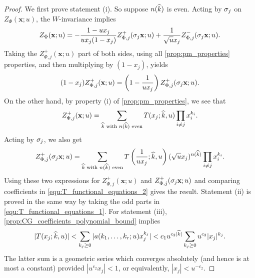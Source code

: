     \begin{proof}
        We first prove statement (i). So suppose $n(\widehat{k})$ is even. Acting by $\sigma_{j}$ on $Z_{\Phi}(\mathbf{x};u)$, the $W$-invariance implies
        \begin{equation}\label{equ:T_functional_equations_1}
            Z_{\Phi}(\mathbf{x};u) = -\frac{1-ux_{j}}{ux_{j}(1-x_{j})}Z_{\Phi,j}^{+}(\sigma_{j}\mathbf{x};u)+\frac{1}{\sqrt{u}x_{j}}Z_{\Phi,j}^{-}(\sigma_{j}\mathbf{x};u).
        \end{equation}
        Taking the $Z_{\Phi,j}^{+}(\mathbf{x};u)$ part of both sides, using all \cref{prop:pm_properties} properties, and then multiplying by $(1-x_{j})$, yields
        \begin{equation}\label{equ:T_functional_equations_2}
            (1-x_{j})Z_{\Phi,j}^{+}(\mathbf{x};u) = \left(1-\frac{1}{ux_{j}}\right)Z_{\Phi,j}^{+}(\sigma_{j}\mathbf{x};u).
        \end{equation}
        On the other hand, by property (i) of \cref{prop:pm_properties}, we see that
        \[
            Z_{\Phi,j}^{+}(\mathbf{x};u) = \sum_{\text{$\widehat{k}$ with $n(\widehat{k})$ even}}T(x_{j};\widehat{k},u)\prod_{i \neq j}x_{i}^{k_{i}}.
        \]
        Acting by $\sigma_{j}$, we also get
        \[
            Z_{\Phi,j}^{+}(\sigma_{j}\mathbf{x};u) = \sum_{\text{$\widehat{k}$ with $n(\widehat{k})$ even}}T\left(\frac{1}{ux_{j}};\widehat{k},u\right)(\sqrt{u}x_{j})^{n(\widehat{k})}\prod_{i \neq j}x_{i}^{k_{i}}.
        \]
        Using these two expressions for $Z_{\Phi,j}^{+}(\mathbf{x};u)$ and $Z_{\Phi,j}^{+}(\sigma_{j}\mathbf{x};u)$ and comparing coefficients in \cref{equ:T_functional_equations_2} gives the result. Statement (ii) is proved in the same way by taking the odd parts in \cref{equ:T_functional_equations_1}. For statement (iii), \cref{prop:CG_coefficients_polynomial_bound} implies
        \[
            |T(x_{j};\widehat{k},u)| < \sum_{k_{j} \ge 0}|a(k_{1},\ldots,k_{r};u)x_{j}^{k_{j}}| < c_{1}u^{c_{2}|\widehat{k}|}\sum_{k_{j} \ge 0}u^{c_{2}}|x_{j}|^{k_{j}}.
        \]
        The latter sum is a geometric series which converges absolutely (and hence is at most a constant) provided $|u^{c_{2}}x_{j}| < 1$, or equivalently, $|x_{j}| < u^{-c_{2}}$.
    \end{proof}


